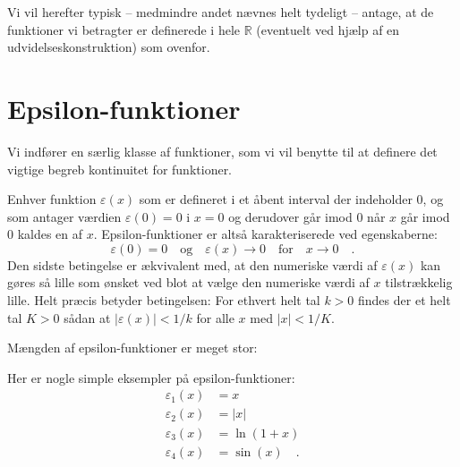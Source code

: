 Vi vil herefter typisk -- medmindre andet nævnes helt tydeligt -- antage, at de funktioner vi betragter er definerede i hele $\mathbb{R}$ (eventuelt ved hjælp af en udvidelseskonstruktion) som ovenfor.




\section{Epsilon-funktioner} \label{tn14.secOmvendtFunk}

Vi indfører en særlig klasse af funktioner, som vi vil benytte til at definere
det vigtige begreb kontinuitet for funktioner.

\begin{definition} \label{tn14.defEpsilonFunk}
 Enhver funktion $\varepsilon(x)$ som er defineret i et åbent interval der indeholder $0$,
 og som antager værdien $\varepsilon(0) = 0$ i $x=0$ og
 derudover går imod $0$ når $x$ går imod $0$ kaldes en  af $x$. Epsilon-funktioner er altså karakteriserede ved egenskaberne:
 \begin{equation}
 \varepsilon(0) = 0 \quad \textrm{og} \quad  \varepsilon(x) \to 0 \quad \textrm{for} \quad x \to 0 \quad .
 \end{equation}
Den sidste betingelse er ækvivalent med, at den numeriske værdi af $\varepsilon(x)$ kan gøres så lille som ønsket ved blot at vælge den numeriske værdi af $x$ tilstrækkelig lille. Helt præcis betyder betingelsen:
For ethvert helt tal $k >0$ findes der et helt tal $K > 0$ sådan at $|\varepsilon(x)| < 1/k$ for alle $x$ med  $|x| < 1/K$.\\
\end{definition}

Mængden af epsilon-funktioner er meget stor:

\begin{example}
Her er nogle simple eksempler på epsilon-funktioner:
\begin{equation}
\begin{aligned}
\varepsilon_{1}(x) &=  x\\
\varepsilon_{2}(x) &=  |x| \\
\varepsilon_{3}(x) &= \ln(1+x) \\
\varepsilon_{4}(x) &= \sin(x) \quad .\\
\end{aligned}
\end{equation}
\end{example}

